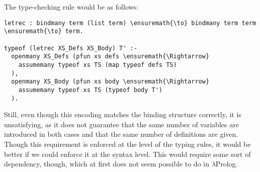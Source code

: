 The type-checking rule would be as follows:

\begin{verbatim}
letrec : bindmany term (list term) \ensuremath{\to} bindmany term term \ensuremath{\to} term.

typeof (letrec XS_Defs XS_Body) T' :-
  openmany XS_Defs (pfun xs defs \ensuremath{\Rightarrow}
    assumemany typeof xs TS (map typeof defs TS)
  ),
  openmany XS_Body (pfun xs body \ensuremath{\Rightarrow}
    assumemany typeof xs TS (typeof body T')
  ).
\end{verbatim}

Still, even though this encoding matches the binding structure
correctly, it is unsatisfying, as it does not guarantee that the same
number of variables are introduced in both cases and that the same
number of definitions are given. Though this requirement is enforced at
the level of the typing rules, it would be better if we could enforce it
at the syntax level. This would require some sort of dependency, though,
which at first does not seem possible to do in \ensuremath{\lambda}Prolog.
